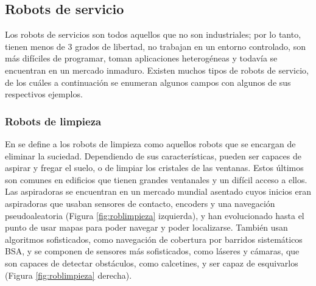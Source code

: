 \setcounter{footnote}{5} %


\subsection{Robots de servicio}

Los robots de servicios son todos aquellos que no son industriales; por lo tanto, tienen menos de 3 grados de libertad, no trabajan en un entorno controlado, son más difíciles de programar, toman aplicaciones heterogéneas y todavía se encuentran en un mercado inmaduro. Existen muchos tipos de robots de servicio, de los cuáles a continuación se enumeran algunos campos con algunos de sus respectivos ejemplos.


\subsubsection{Robots de limpieza}

En \cite{plaza_robotica_servicio} se define a los robots de limpieza como aquellos robots que se encargan de eliminar la suciedad. Dependiendo de sus características, pueden ser capaces de aspirar y fregar el suelo, o de limpiar los cristales de las ventanas. Estos últimos son comunes en edificios que tienen grandes ventanales y un difícil acceso a ellos. Las aspiradoras se encuentran en un mercado mundial asentado cuyos inicios eran aspiradoras que usaban sensores de contacto, encoders y una navegación pseudoaleatoria (Figura \ref{fig:roblimpieza} izquierda), y han evolucionado hasta el punto de usar mapas para poder navegar y poder localizarse. También usan algoritmos sofisticados, como navegación de cobertura por barridos sistemáticos \acs{BSA}, y se componen de sensores más sofisticados, como láseres y cámaras, que son capaces de detectar obstáculos, como calcetines, y ser capaz de esquivarlos (Figura \ref{fig:roblimpieza} derecha).\\


